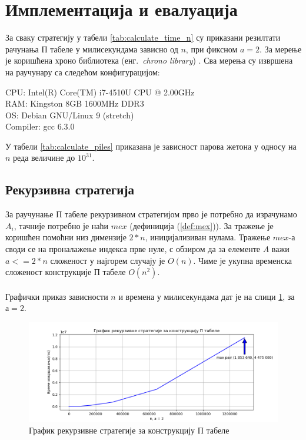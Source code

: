 \documentclass[a4paper]{article}
\begin{document}
\section{Имплементација и евалуација}
\label{implementacija_evaluacija}

За сваку стратегију у табели \ref{tab:calculate_time_n} су приказани резилтати рачунања П табеле у милисекундама зависно од $ n $, при фиксном $ a = 2 $. 
За мерење је коришћена хроно библиотека (енг.{~\em chrono library}) \cite{chrono_library}. Сва мерења су извршена на раучунару са следећом конфигурацијом:
\begin{flushleft}
	CPU: Intel(R) Core(TM) i7-4510U CPU @ 2.00GHz\\
	RAM: Kingston 8GB 1600MHz DDR3\\
	OS: Debian GNU/Linux 9 (stretch)\\
	Compiler: gcc 6.3.0\\
\end{flushleft}

У табели \ref{tab:calculate_piles} приказана је зависност парова жетона у односу на $ n $ реда величине до $ 10^{31} $.

\subsection{Рекурзивна стратегија}

За раучунање П табеле рекурзивном стратегијом прво је потребно да израчунамо $ A_{i} $, тачније потребно је наћи $ mex $ (дефиниција (\ref{def:mex})). За тражење је коришћен помоћни низ димензије $ 2*n $, иницијализиван нулама. Тражење $ mex $-а  своди се на проналажење индекса прве нуле, с обзиром да за елементе $ A $ важи $ a <= 2*n $ сложеност у најгорем случају је $ O(n) $. Чиме је укупна временска сложеност конструкције П табеле $ O(n^2) $.\\



\leavevmode\\
Графички приказ зависности $ n $ и времена у милисекундама дат је на слици \ref{fig:recursive}, за $ а = 2 $.

\begin{figure}[H]
	\caption{График рекурзивне стратегије за конструкцију П табеле}
	\label{fig:recursive}
	\begin{center}
		\includegraphics[width=\textwidth]{recursive.png}
	\end{center}
\end{figure}
\end{document}
